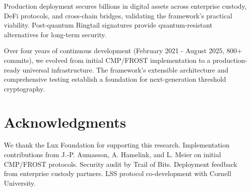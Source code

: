\documentclass[11pt,twocolumn]{article}
\begin{document}
Production deployment secures billions in digital assets across enterprise custody, DeFi protocols, and cross-chain bridges, validating the framework's practical viability. Post-quantum Ringtail signatures provide quantum-resistant alternatives for long-term security.

Over four years of continuous development (February 2021 - August 2025, 800+ commits), we evolved from initial CMP/FROST implementation to a production-ready universal infrastructure. The framework's extensible architecture and comprehensive testing establish a foundation for next-generation threshold cryptography.

\section*{Acknowledgments}

We thank the Lux Foundation for supporting this research. Implementation contributions from J.-P. Aumasson, A. Hamelink, and L. Meier on initial CMP/FROST protocols. Security audit by Trail of Bits. Deployment feedback from enterprise custody partners. LSS protocol co-development with Cornell University.
\end{document}
